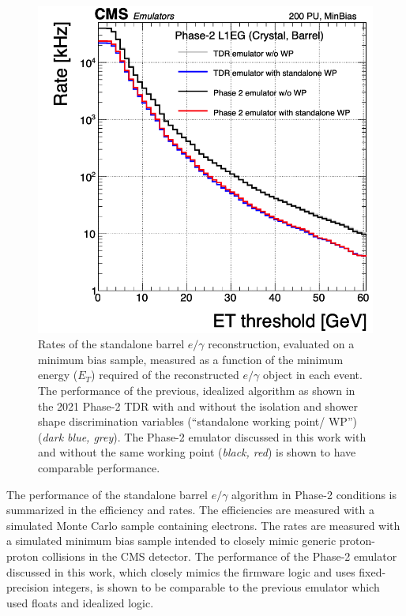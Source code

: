 \begin{figure}[ht]
    \centering
    \includegraphics[width=12cm]{figures/ch-4-phase2/results-egamma-rates.png}
    \caption[Rates of the standalone barrel $e/\gamma$ reconstruction measured as a function of the minimum energy ($E_T$) required of the reconstructed $e/\gamma$ object in each event.]{Rates of the standalone barrel $e/\gamma$ reconstruction, evaluated on a minimum bias sample, measured as a function of the minimum energy ($E_T$) required of the reconstructed $e/\gamma$ object in each event. The performance of the previous, idealized algorithm as shown in the 2021 Phase-2 TDR \cite{CMS-TDR-021} with and without the isolation and shower shape discrimination variables (``standalone working point/ WP'') (\textit{dark blue, grey}). The Phase-2 emulator discussed in this work with and without the same working point (\textit{black, red}) is shown to have comparable performance.}
    \label{fig:results-egamma-rates}
\end{figure}


The performance of the standalone barrel $e/\gamma$ algorithm in Phase-2 conditions is summarized in the efficiency and rates. The efficiencies are measured with a simulated Monte Carlo sample containing electrons. The rates are measured with a simulated minimum bias sample intended to closely mimic generic proton-proton collisions in the CMS detector. The performance of the Phase-2 emulator discussed in this work, which closely mimics the firmware logic and uses fixed-precision integers, is shown to be comparable to the previous emulator which used floats and idealized logic.

